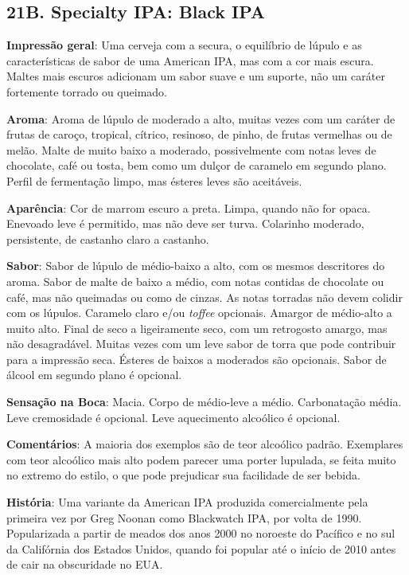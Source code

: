 \subsection*{21B. Specialty IPA: Black IPA}
\textbf{Impressão geral}: Uma cerveja com a secura, o equilíbrio de lúpulo e as características de sabor de uma American IPA, mas com a cor mais escura. Maltes mais escuros adicionam um sabor suave e um suporte, não um caráter fortemente torrado ou queimado.

\textbf{Aroma}: Aroma de lúpulo de moderado a alto, muitas vezes com um caráter de frutas de caroço, tropical, cítrico, resinoso, de pinho, de frutas vermelhas ou de melão. Malte de muito baixo a moderado, possivelmente com notas leves de chocolate, café ou tosta, bem como um dulçor de caramelo em segundo plano. Perfil de fermentação limpo, mas ésteres leves são aceitáveis.

\textbf{Aparência}: Cor de marrom escuro a preta. Limpa, quando não for opaca. Enevoado leve é permitido, mas não deve ser turva. Colarinho moderado, persistente, de castanho claro a castanho.

\textbf{Sabor}: Sabor de lúpulo de médio-baixo a alto, com os mesmos descritores do aroma. Sabor de malte de baixo a médio, com notas contidas de chocolate ou café, mas não queimadas ou como de cinzas. As notas torradas não devem colidir com os lúpulos. Caramelo claro e/ou \textit{toffee} opcionais. Amargor de médio-alto a muito alto. Final de seco a ligeiramente seco, com um retrogosto amargo, mas não desagradável. Muitas vezes com um leve sabor de torra que pode contribuir para a impressão seca. Ésteres de baixos a moderados são opcionais. Sabor de álcool em segundo plano é opcional.

\textbf{Sensação na Boca}: Macia. Corpo de médio-leve a médio. Carbonatação média. Leve cremosidade é opcional. Leve aquecimento alcoólico é opcional.

\textbf{Comentários}: A maioria dos exemplos são de teor alcoólico padrão. Exemplares com teor alcoólico mais alto podem parecer uma porter lupulada, se feita muito no extremo do estilo, o que pode prejudicar sua facilidade de ser bebida.

\textbf{História}: Uma variante da American IPA produzida comercialmente pela primeira vez por Greg Noonan como Blackwatch IPA, por volta de 1990. Popularizada a partir de meados dos anos 2000 no noroeste do Pacífico e no sul da Califórnia dos Estados Unidos, quando foi popular até o início de 2010 antes de cair na obscuridade no EUA.

